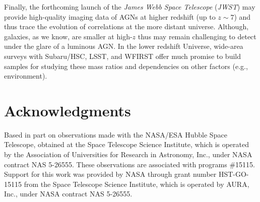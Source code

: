 \documentclass[apj]{emulateapj}
\begin{document}
Finally, the forthcoming launch of the {\it James Webb Space Telescope} ({\it JWST}) may provide high-quality imaging data of AGNs at higher redshift (up to $z\sim7$) and thus trace the evolution of correlations at the more distant universe. Although, galaxies, as we know, are smaller at high-$z$ thus may remain challenging to detect under the glare of a luminous AGN. In the lower redshift Universe, wide-area surveys with Subaru/HSC, LSST, and WFIRST offer much promise to build samples for studying these mass ratios and dependencies on other factors (e.g., environment).  



%

\section*{Acknowledgments}
Based in part on observations made with the NASA/ESA Hubble Space Telescope, obtained at the Space Telescope Science Institute, which is operated by the Association of Universities for Research in Astronomy, Inc., under NASA contract NAS 5-26555. These observations are associated with programs
\#15115. Support for this work was provided by NASA through grant number HST-GO-15115 from the Space Telescope Science Institute, which is operated by AURA, Inc., under NASA contract NAS 5-26555.
\end{document}
